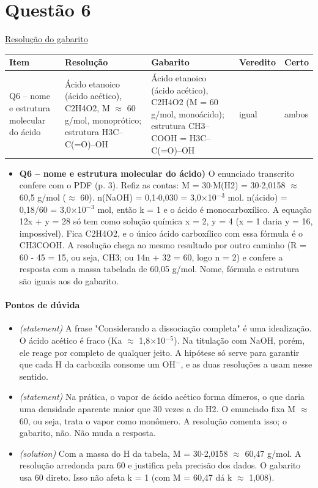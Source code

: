 \documentclass{article}%
\begin{document}
\section*{Questão 6}%
\href{https://poliedroresolve.sistemapoliedro.com.br/vestibulares/ime/2026/ime-2-fase-dia-3-25-10-2025-2-fase-dia-3/dissertativa-6-quimica-2-fase-dia-3-ime-2026}{Resolução do gabarito}\par\smallskip%
\begin{longtable}{@{}p{} p{} p{} p{} p{}@{}}\toprule Item & Resolução & Gabarito & Veredito & Certo \\ \midrule
Q6 -- nome e estrutura molecular do ácido & Ácido etanoico (ácido acético), C2H4O2, M $\approx$ 60 g/mol, monoprótico; estrutura H3C--C(=O)--OH & Ácido etanoico (ácido acético), C2H4O2 (M = 60 g/mol, monoácido); estrutura CH3--COOH = H3C--C(=O)--OH & igual & ambos \\
\bottomrule\end{longtable}%
\begin{itemize}%
\item%
\textbf{Q6 -- nome e estrutura molecular do ácido)} O enunciado transcrito confere com o PDF (p. 3). Refiz as contas: M = 30$\cdot$M(H2) = 30$\cdot$2,0158 $\approx$ 60,5 g/mol ($\approx$ 60). n(NaOH) = 0,1$\cdot$0,030 = 3,0$\times$10$^{-}$$^3$ mol. n(ácido) = 0,18/60 = 3,0$\times$10$^{-}$$^3$ mol, então k = 1 e o ácido é monocarboxílico. A equação 12x + y = 28 só tem como solução química x = 2, y = 4 (x = 1 daria y = 16, impossível). Fica C2H4O2, e o único ácido carboxílico com essa fórmula é o CH3COOH. A resolução chega ao mesmo resultado por outro caminho (R = 60 - 45 = 15, ou seja, CH3; ou 14n + 32 = 60, logo n = 2) e confere a resposta com a massa tabelada de 60,05 g/mol. Nome, fórmula e estrutura são iguais aos do gabarito.%
\end{itemize}%
\paragraph{Pontos de dúvida}%
\begin{itemize}%
\item%
\textit{(statement)} A frase "Considerando a dissociação completa" é uma idealização. O ácido acético é fraco (Ka $\approx$ 1,8$\times$10$^{-}$$^{5}$). Na titulação com NaOH, porém, ele reage por completo de qualquer jeito. A hipótese só serve para garantir que cada H da carboxila consome um OH$^{-}$, e as duas resoluções a usam nesse sentido.%
\item%
\textit{(statement)} Na prática, o vapor de ácido acético forma dímeros, o que daria uma densidade aparente maior que 30 vezes a do H2. O enunciado fixa M $\approx$ 60, ou seja, trata o vapor como monômero. A resolução comenta isso; o gabarito, não. Não muda a resposta.%
\item%
\textit{(solution)} Com a massa do H da tabela, M = 30$\cdot$2,0158 $\approx$ 60,47 g/mol. A resolução arredonda para 60 e justifica pela precisão dos dados. O gabarito usa 60 direto. Isso não afeta k = 1 (com M = 60,47 dá k $\approx$ 1,008).%
\end{itemize}%
\end{document}
